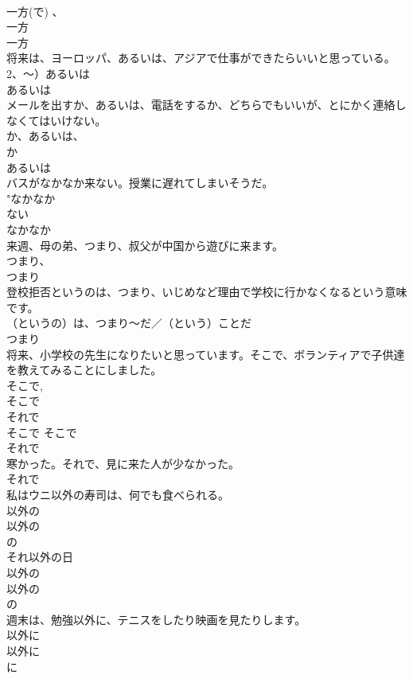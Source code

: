 \documentclass[8pt]{extreport}
\begin{document}
\begin{CJK}{UTF8}{min}
{\\	一方(で) 、
\\	一方 
\\	一方 
\\	将来は、ヨーロッパ、あるいは、アジアで仕事ができたらいいと思っている。	
\\	2、〜）あるいは 
\\	あるいは 
\\	メールを出すか、あるいは、電話をするか、どちらでもいいが、とにかく連絡しなくてはいけない。	
\\	か、あるいは、
\\	か 
\\	あるいは 
\\	バスがなかなか来ない。授業に遅れてしまいそうだ。	
\\	"なかなか 
\\	ない 
\\	なかなか 
\\	来週、母の弟、つまり、叔父が中国から遊びに来ます。	
\\	つまり、
\\	つまり
\\	登校拒否というのは、つまり、いじめなど理由で学校に行かなくなるという意味です。	
\\	（というの）は、つまり〜{だ／（という）ことだ} 
\\	つまり
\\	将来、小学校の先生になりたいと思っています。そこで、ボランティアで子供達を教えてみることにしました。	
\\	そこで, 
\\	そこで 
\\	それで 
\\	そこで そこで 
\\	それで 
\\	寒かった。それで、見に来た人が少なかった。 
\\	それで 
\\	私はウニ以外の寿司は、何でも食べられる。	
\\	以外の 
\\	以外の
\\	の
\\	それ以外の日	
\\	以外の 
\\	以外の
\\	の
\\	週末は、勉強以外に、テニスをしたり映画を見たりします。	
\\	以外に 
\\	以外に 
\\	に 
}
\end{CJK}
\end{document}
